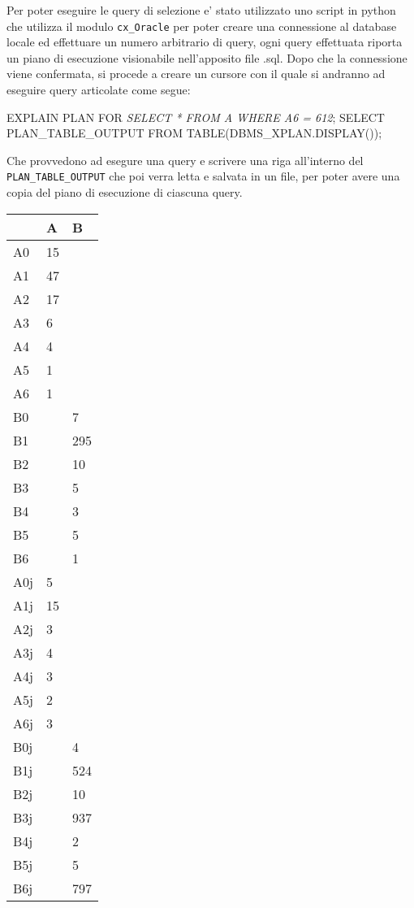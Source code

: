 Per poter eseguire le query di selezione e' stato utilizzato uno script in python che utilizza il modulo \verb|cx_Oracle| per poter creare una connessione 
al database locale ed effettuare un numero arbitrario di query, ogni query effettuata riporta un piano di esecuzione visionabile nell'apposito file 
.sql. Dopo che la connessione viene confermata, si procede a creare 
un cursore con il quale si andranno ad eseguire query articolate come segue:

\begin{Verbatim*}
        EXPLAIN PLAN FOR \emph{SELECT * FROM A WHERE A6 = 612};
        SELECT PLAN_TABLE_OUTPUT FROM TABLE(DBMS_XPLAN.DISPLAY());
\end{Verbatim*}

Che provvedono ad esegure una query e scrivere una riga all'interno del \verb|PLAN_TABLE_OUTPUT| che poi verra letta e salvata 
in un file, per poter avere una copia del piano di esecuzione di ciascuna query.

\begin{table}[!ht]
    \centering
    \begin{tabular}{|l|l|l|}
    \hline
        ~ & A & B \\ \hline
        A0 & 15 & ~ \\ \hline
        A1 & 47 & ~ \\ \hline
        A2 & 17 & ~ \\ \hline
        A3 & 6 & ~ \\ \hline
        A4 & 4 & ~ \\ \hline
        A5 & 1 & ~ \\ \hline
        A6 & 1 & ~ \\ \hline
        B0 & ~ & 7 \\ \hline
        B1 & ~ & 295 \\ \hline
        B2 & ~ & 10 \\ \hline
        B3 & ~ & 5 \\ \hline
        B4 & ~ & 3 \\ \hline
        B5 & ~ & 5 \\ \hline
        B6 & ~ & 1 \\ \hline
        A0j & 5 & ~ \\ \hline
        A1j & 15 & ~ \\ \hline
        A2j & 3 & ~ \\ \hline
        A3j & 4 & ~ \\ \hline
        A4j & 3 & ~ \\ \hline
        A5j & 2 & ~ \\ \hline
        A6j & 3 & ~ \\ \hline
        B0j & ~ & 4 \\ \hline
        B1j & ~ & 524 \\ \hline
        B2j & ~ & 10 \\ \hline
        B3j & ~ & 937 \\ \hline
        B4j & ~ & 2 \\ \hline
        B5j & ~ & 5 \\ \hline
        B6j & ~ & 797 \\ \hline
    \end{tabular}
\end{table}